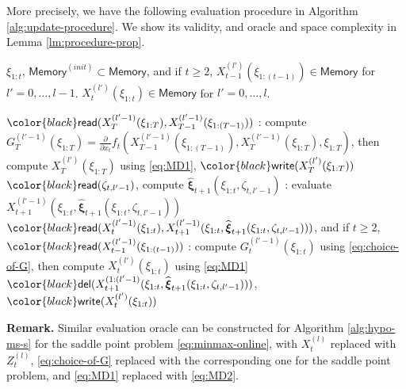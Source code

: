 \documentclass[11pt,fullpage,letterpaper]{article}
\newcommand{\bx}{\boldsymbol{\xi}}
\newcommand{\memo}{\mathsf{Memory}}
\newcommand{\rr}[1]{{\color{black}\mathsf{read}(#1)}}
\newcommand{\ww}[1]{{\color{black}\mathsf{write}(#1)}}
\newcommand{\del}[1]{{\color{black}\mathsf{del}(#1)}}
\begin{document}
More precisely, we have the following evaluation procedure in Algorithm \ref{alg:update-procedure}. We show its validity, and oracle and space complexity in Lemma \ref{lm:procedure-prop}. 



\begin{algorithm}
\caption{Evaluation procedure for $X_t^{(l)}(\xi_{1:t})$}\label{alg:update-procedure}
\begin{algorithmic}
\Require $\xi_{1:t}$, $\memo^{(init)}\subset \memo$, and if $t\geq 2$, $ X_{t-1}^{(l')}(\xi_{1:(t-1)})\in \memo$ for $l'=0,\ldots,l-1$.
\Ensure $X_t^{(l')}(\xi_{1:t})\in \memo$ for $l'=0,\ldots,l$. 

\State $\rr{X_T^{(l'-1)}(\xi_{1:T}),X_{T-1}^{(l'-1)}(\xi_{1:(T-1)})}$
\State {\color{blue}{Step 2}}: compute $G_T^{(l'-1)}(\xi_{1:T}) = \frac{\partial}{\partial x_t} f_t(X_{T-1}^{(l'-1)}(\xi_{1:(T-1)}),X_T^{(l'-1)}(\xi_{1:T}),\xi_{1:T})$, then compute $X_T^{(l')}(\xi_{1:T})$ using \eqref{eq:MD1}, $\ww{X_T^{(l')}(\xi_{1:T})}$
\EndFor
\Else 
{}
\State $\rr{\zeta_{t,l'-1}}$, compute $\widehat{\bx}_{t+1}(\xi_{1:t},\zeta_{t,l'-1})$
\State {\color{red}{Step 1}}: evaluate $X_{t+1}^{(l'-1)}(\xi_{1:t},\widehat{\bx}_{t+1}(\xi_{1:t},\zeta_{t,l'-1}))$
\State $\rr{X_t^{(l'-1)}(\xi_{1:t}),X_{t+1}^{(l'-1)}(\xi_{1:t},\widehat{\bx}_{t+1}(\xi_{1:t},\zeta_{t,l'-1}))}$, and if $t\geq 2$, $\rr{X_{t-1}^{(l'-1)}(\xi_{1:(t-1)})}$
\State {\color{blue}{Step 2}}: compute $G_t^{(l'-1)}(\xi_{1:t}) $ using \eqref{eq:choice-of-G}, then compute $X_t^{(l')}(\xi_{1:t})$ using \eqref{eq:MD1}
\State $\del{X_{t+1}^{(1:(l'-1)}(\xi_{1:t},\widehat{\bx}_{t+1}(\xi_{1:t},\zeta_{t,l'-1}))}$, $\ww{X_t^{(l')}(\xi_{1:t})}$
\EndFor
\EndIf
\end{algorithmic}
\end{algorithm}

\textbf{Remark.} Similar evaluation oracle can be constructed for Algorithm \ref{alg:hypo-ms-s} for the saddle point problem \eqref{eq:minmax-online}, with $X_t^{(l)}$ replaced with $Z_t^{(l)}$, \eqref{eq:choice-of-G} replaced with the corresponding one for the saddle point problem, and \eqref{eq:MD1} replaced with \eqref{eq:MD2}. 
\end{document}
